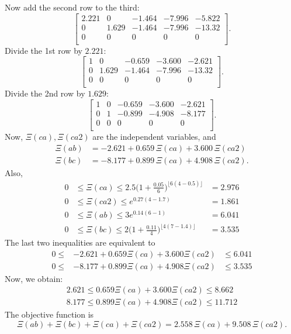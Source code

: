 \documentclass[10pt]{article}
\begin{document}
Now add the second row to the third:
\[
\begin{bmatrix}
2.221 & 0 & -1.464 & -7.996 & -5.822 \\
0 & 1.629 & -1.464 & -7.996 & -13.32 \\
0 & 0 & 0 & 0 & 0 \\
\end{bmatrix}.
\]
Divide the 1st row by $2.221$:
\[
\begin{bmatrix}
1 & 0 & -0.659 & -3.600 & -2.621 \\
0 & 1.629 & -1.464 & -7.996 & -13.32 \\
0 & 0 & 0 & 0 & 0 \\
\end{bmatrix}.
\]
Divide the 2nd row by $1.629$:
\[
\begin{bmatrix}
1 & 0 & -0.659 & -3.600 & -2.621 \\
0 & 1 & -0.899 & -4.908 & -8.177 \\
0 & 0 & 0 & 0 & 0 \\
\end{bmatrix}.
\]
Now, $\Xi(ca), \Xi(ca2)$ are the independent variables, and 
\begin{align*}
\Xi(ab) &= -2.621 + 0.659 \, \Xi(ca) + 3.600 \, \Xi(ca2) \\
\Xi(bc) &= -8.177 + 0.899 \, \Xi(ca) + 4.908 \, \Xi(ca2).
\end{align*}
Also,
\begin{align*}
0 & \leq \Xi(ca) \leq 2.5 \Big( 1 + \frac{0.05}{6} \Big)^{ \lfloor 6 (4 - 0.5) \rfloor } & = 2.976 \\
0 & \leq \Xi(ca2) \leq e^{0.27 (4 - 1.7)} & = 1.861 \\
0 & \leq \Xi(ab) \leq 3e^{0.14(6 - 1)} &= 6.041 \\
0 & \leq \Xi(bc) \leq 2 \Big( 1 + \frac{0.11}{4} \Big)^{ \lfloor 4(7 - 1.4) \rfloor } &= 3.535
\end{align*}
The last two inequalities are equivalent to 
\begin{align*}
0 \leq & -2.621 + 0.659 \Xi(ca) +3.600 \Xi(ca2) & \leq 6.041 \\
0 \leq & -8.177 + 0.899 \Xi(ca) + 4.908 \Xi(ca2) & \leq 3.535
\end{align*}
Now, we obtain:
\begin{align*}
2.621 \leq 0.659 \Xi(ca) + 3.600 \Xi(ca2) \leq 8.662 \\
8.177 \leq 0.899 \Xi(ca) + 4.908 \Xi(ca2) \leq 11.712
\end{align*}
The objective function is 
\[
\Xi(ab) + \Xi(bc) + \Xi(ca) + \Xi(ca2) = 2.558 \, \Xi(ca) + 9.508 \, \Xi(ca2).
\]
\end{document}
